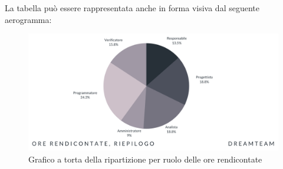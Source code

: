 La tabella può essere rappresentata anche in forma visiva dal seguente aerogramma:
\begin{figure}[H]
\centering
\includegraphics[scale=0.65]{Sezioni/SezioniPreventivo/grafici/Riepilogo_ore_rendicontate_costi.png}
\caption{Grafico a torta della ripartizione per ruolo delle ore rendicontate}
\end{figure}